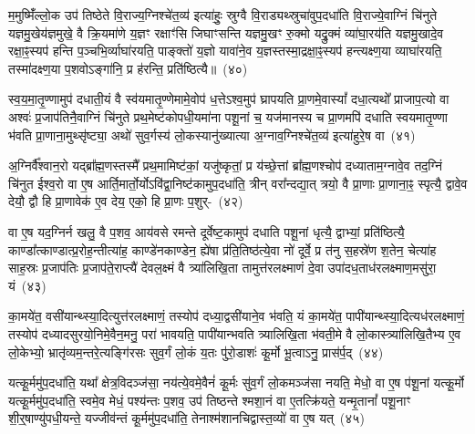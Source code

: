 म॒मुष्मिँ॑ल्लो॒क उप॑ तिष्ठेते वि॒राज्य॒ग्निश्चे॑त॒व्य॑ इत्या॑हुः॒ स्रुग्वै वि॒राड्यथ्स्रुचा॑वुप॒\-दधा॑ति वि॒राज्ये॒वाग्निं चि॑नुते यज्ञमु॒खेय॑ज्ञमुखे॒ वै क्रि॒यमा॑णे य॒ज्ञꣳ रक्षाꣳ॑सि जिघाꣳसन्ति यज्ञमु॒खꣳ रु॒क्मो यद्रु॒क्मं व्या॑घा॒रय॑ति यज्ञमु॒खादे॒व रक्षा॒ꣴ॒स्यप॑ हन्ति प॒ञ्चभि॒र्व्याघा॑रयति॒ पाङ्क्तो॑ य॒ज्ञो यावा॑ने॒व य॒ज्ञस्तस्मा॒द्रक्षा॒ꣴ॒स्यप॑ हन्त्यक्ष्ण॒या व्याघा॑रयति॒ तस्मा॑दक्ष्ण॒या प॒शवो\-ऽङ्गा॑नि॒ प्र ह॑रन्ति॒ प्रति॑ष्ठित्यै॥~(४०)\ip

{\anuvakamend[{वन॒स्पत॑यो दक्षिण॒तो ध॑त्त एनं॒ तस्मा॑दक्ष्ण॒या पञ्च॑ च}]}

स्व॒य॒मा॒तृ॒ण्णामुप॑ दधाती॒यं वै स्व॑यमातृ॒ण्णेमामे॒वोप॑ ध॒त्ते\-ऽश्व॒मुप॑ घ्रापयति प्रा॒णमे॒वास्यां᳚ दधा॒त्यथो᳚ प्राजाप॒त्यो वा अश्वः॑ प्र॒जा\-प॑तिनै॒वाग्निं चि॑नुते प्रथ॒मेष्ट॑कोपधी॒यमा॑ना पशू॒नां च॒ यज॑मानस्य च प्रा॒णमपि॑ दधाति स्वयमा\-तृ॒ण्णा भ॑वति प्रा॒णाना॒मुथ्सृ॑ष्ट्या॒ अथो॑ सुव॒र्गस्य॑ लो॒कस्यानु॑ख्यात्या अ॒ग्नाव॒ग्निश्चे॑त॒व्य॑ इत्या॑हुरे॒ष वा~(४१)\ip

अ॒ग्निर्वै᳚श्वान॒रो यद्ब्रा᳚ह्म॒णस्तस्मै᳚ प्रथ॒मामिष्ट॑कां॒ यजु॑ष्कृतां॒ प्र य॑च्छे॒त्तां ब्रा᳚ह्म॒णश्चोप॑ दध्याताम॒ग्नावे॒व तद॒ग्निं चि॑नुत ईश्व॒रो वा ए॒ष आर्ति॒मार्तो॒र्यो\-ऽवि॑द्वा॒निष्ट॑कामुप॒\-दधा॑ति॒ त्रीन् वरा᳚न्दद्या॒त् त्रयो॒ वै प्रा॒णाः प्रा॒णाना॒ꣴ॒ स्पृत्यै॒ द्वावे॒व देयौ॒ द्वौ हि प्रा॒णावेक॑ ए॒व देय॒ एको॒ हि प्रा॒णः प॒शुर्-~(४२)\ip

वा ए॒ष यद॒ग्निर्न खलु॒ वै प॒शव॒ आय॑वसे रमन्ते दूर्वेष्ट॒कामुप॑ दधाति पशू॒नां धृत्यै॒ द्वाभ्यां॒ प्रति॑ष्ठित्यै॒ काण्डा᳚त्काण्डात्प्र॒रोह॒न्तीत्या॑ह॒ काण्डे॑नकाण्डेन॒ ह्ये॑षा प्र॑ति॒तिष्ठ॑त्ये॒वा नो॑ दूर्वे॒ प्र त॑नु स॒हस्रे॑ण श॒तेन॒ चेत्या॑ह साह॒स्रः प्र॒जा\-प॑तिः प्र॒जा\-प॑ते॒राप्त्यै॑ देवल॒क्ष्मं वै त्र्या॑लिखि॒ता तामुत्त॑रलक्ष्माणं दे॒वा उपा॑दध॒ताध॑रलक्ष्माण॒मसु॑रा॒ यं~(४३)\ip

का॒मये॑त॒ वसी॑यान्थ्स्या॒दित्युत्त॑रलक्ष्माणं॒ तस्योप॑ दध्या॒द्वसी॑याने॒व भ॑वति॒ यं का॒मये॑त॒ पापी॑यान्थ्स्या॒दित्यध॑र\-लक्ष्माणं॒ तस्योप॑ दध्यादसुरयो॒निमे॒वैन॒मनु॒ परा॑ भावयति॒ पापी॑यान्भवति त्र्यालिखि॒ता भ॑वती॒मे वै लो॒का\-स्त्र्या॑लिखि॒तैभ्य ए॒व लो॒केभ्यो॒ भ्रातृ॑व्यम॒न्तरे॒त्यङ्गि॑रसः सुव॒र्गं लो॒कं य॒तः पु॑रो॒डाशः॑ कू॒र्मो भू॒त्वाऽनु॒ प्रास॑र्प॒द्~(४४)\ip

यत्कू॒र्ममु॑प॒\-दधा॑ति॒ यथा᳚ क्षेत्र॒विदञ्ज॑सा॒ नय॑त्ये॒वमे॒वैनं॑ कू॒र्मः सु॑व॒र्गं लो॒कमञ्ज॑सा नयति॒ मेधो॒ वा ए॒ष प॑शू॒नां यत्कू॒र्मो यत्कू॒र्ममु॑प॒\-दधा॑ति॒ स्वमे॒व मेधं॒ पश्य॑न्तः प॒शव॒ उप॑ तिष्ठन्ते श्मशा॒नं वा ए॒तत्क्रि॑यते॒ यन्मृ॒तानां᳚ पशू॒नाꣳ शी॒र्॒\mbox{}षाण्यु॑पधी॒यन्ते॒ यज्जीव॑न्तं कू॒र्ममु॑प॒\-दधा॑ति॒ तेनाश्म॑शानचिद्वास्त॒व्यो॑ वा ए॒ष यत्~(४५)\ip


